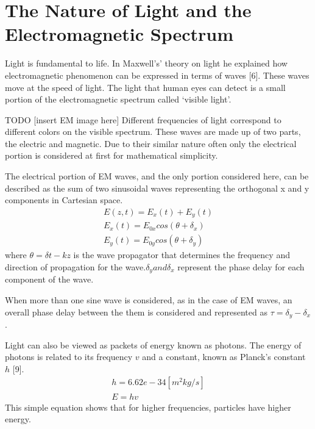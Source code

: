 \section{The Nature of Light and the Electromagnetic Spectrum}
Light is fundamental to life.  In Maxwell’s’ theory on light he explained how electromagnetic phenomenon can be expressed in terms of waves [6].  These waves move at the speed of light.  The light that human eyes can detect is a small portion of the electromagnetic spectrum called ‘visible light’.

TODO [insert EM image here]
Different frequencies of light correspond to different colors on the visible spectrum.  These waves are made up of two parts, the electric and magnetic.  Due to their similar nature often only the electrical portion is considered at first for mathematical simplicity.

The electrical portion of EM waves, and the only portion considered here, can be described as the sum of two sinusoidal waves representing the orthogonal x and y components in Cartesian space.
%
\begin{align}
    E(z,t)=E_x (t)+E_y (t)\\
    E_x (t)=E_{0x} cos( \theta+\delta_x )\\
    E_y (t)=E_{0y} cos( \theta+\delta_y )
\end{align}
%
where $ \theta = \delta t-kz $ is the wave propagator that determines the frequency and direction of propagation for the wave.$ \delta_y and \delta_x $ represent the phase delay for each component of the wave.

When more than one sine wave is considered, as in the case of EM waves, an overall phase delay between the them is considered and represented as $ \tau=\delta_y-\delta_x $.

Light can also be viewed as packets of energy known as photons.  The energy of photons is related to its frequency $v$ and a constant, known as Planck’s constant $h$ [9].
%
\begin{align}
	h=6.62e-34 [m^2 kg/s]\\
	E=hv
\end{align}
%
This simple equation shows that for higher frequencies, particles have higher energy.






